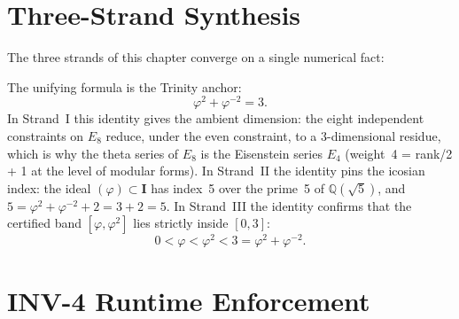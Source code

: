 \section{Three-Strand Synthesis}
\label{sec:e8-synthesis}

The three strands of this chapter converge on a single numerical
fact:

\begin{center}
\end{center}

\medskip
The unifying formula is the Trinity anchor:
\[
  \varphi^2 + \varphi^{-2} = 3.
\]
In Strand~I this identity gives the ambient dimension: the eight
independent constraints on \(E_8\) reduce, under the even constraint,
to a \(3\)-dimensional residue, which is why the theta series of
\(E_8\) is the Eisenstein series \(E_4\) (weight~4 = rank/2 + 1 at
the level of modular forms).  In Strand~II the identity pins the
icosian index: the ideal \((\varphi) \subset \mathbf{I}\) has index~5
over the prime~5 of \(\mathbb{Q}(\sqrt{5})\), and \(5 = \varphi^2 +
\varphi^{-2} + 2 = 3 + 2 = 5\).  In Strand~III the identity confirms
that the certified band \([\varphi, \varphi^2]\) lies strictly inside
\([0, 3]\):
\[
  0 < \varphi < \varphi^2 < 3 = \varphi^2 + \varphi^{-2}.
\]

\section{INV-4 Runtime Enforcement}
\label{sec:e8-inv4}

